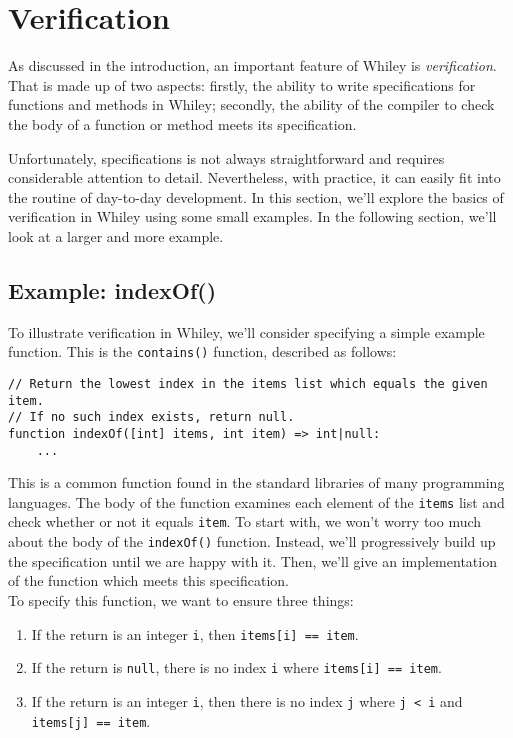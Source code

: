 \newpage
\section{Verification}

As discussed in the introduction, an important feature of Whiley is
{\em verification}.  That is made up of two aspects: firstly, the
ability to write specifications for functions and methods in Whiley;
secondly, the ability of the compiler to check the body of a function
or method meets its specification.

Unfortunately, specifications is not always straightforward and
requires considerable attention to detail.  Nevertheless, with
practice, it can easily fit into the routine of day-to-day
development.  In this section, we'll explore the basics of
verification in Whiley using some small examples.  In the following
section, we'll look at a larger and more example.

\subsection{Example: indexOf()} 
To illustrate verification in Whiley, we'll consider specifying a
simple example function.  This is the \lstinline{contains()} function,
described as follows:

\begin{lstlisting}
// Return the lowest index in the items list which equals the given item.
// If no such index exists, return null.
function indexOf([int] items, int item) => int|null:
    ...
\end{lstlisting}

This is a common function found in the standard libraries of many
programming languages.  The body of the function examines each element
of the \lstinline{items} list and check whether or not it equals
\lstinline{item}.  To start with, we won't worry too much about the
body of the \lstinline{indexOf()} function.  Instead, we'll
progressively build up the specification until we are happy with it.
Then, we'll give an implementation of the function which meets this
specification.\\

\noindent To specify this function, we want to ensure three things:

\begin{enumerate}
\item If the return is an integer \lstinline{i}, then
  \lstinline{items[i] == item}.
\item If the return is \lstinline{null}, there is no index
  \lstinline{i} where \lstinline{items[i] == item}.
\item If the return is an integer \lstinline{i}, then there is
  no index \lstinline{j} where \lstinline{j < i} and
  \lstinline{items[j] == item}.
\end{enumerate}

